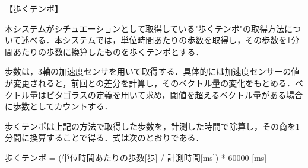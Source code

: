 【歩くテンポ】
\par
本システムがシチュエーションとして取得している"歩くテンポ"の取得方法について述べる．本システムでは，単位時間あたりの歩数を取得し，その歩数を1分間あたりの歩数に換算したものを歩くテンポとする．
\par
歩数は，3軸の加速度センサを用いて取得する．具体的には加速度センサーの値が変更されると，前回との差分を計算し，そのベクトル量の変化をもとめる．ベクトル量はピタゴラスの定義を用いて求め，閾値を超えるベクトル量がある場合に歩数としてカウントする．
\par
歩くテンポは上記の方法で取得した歩数を，計測した時間で除算し，その商を1分間に換算することで得る．式は次のとおりである．
\par
歩くテンポ = (単位時間あたりの歩数[歩] / 計測時間[ms]) * 60000 [ms]
